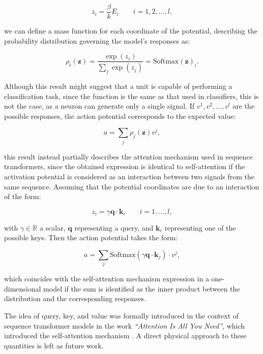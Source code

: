 \documentclass[12pt]{article}
\begin{document}
\begin{equation}
z_i = \frac{\beta}{k} E_i \qquad i = 1, 2, \dots, l  ,
\end{equation}

we can define a mass function for each coordinate of the potential, describing the probability distribution governing the model’s responses as:

\begin{equation}
\rho_i(\mathbf{z}) = \frac{\exp(z_i)}{\sum_j \exp(z_j)} = \text{Softmax}(\mathbf{z})_i.
\end{equation}

Although this result might suggest that a unit is capable of performing a classification task, since the function is the same as that used in classifiers, this is not the case, as a neuron can generate only a single signal. If $v^1, v^2, \dots, v^l$ are the possible responses, the action potential corresponds to the expected value:

\begin{equation}
a = \sum_j \rho_j(\mathbf{z}) v^j,
\end{equation}

this result instead partially describes the attention mechanism used in sequence transformers, since the obtained expression is identical to self-attention if the activation potential is considered as an interaction between two signals from the same sequence. Assuming that the potential coordinates are due to an interaction of the form:

\begin{equation}
z_i = \gamma \mathbf{q} \cdot \mathbf{k}_i \qquad i = 1, \dots, l,
\end{equation}

with $\gamma \in \mathbb{R}$ a scalar, $\mathbf{q}$ representing a query, and $\mathbf{k}_i$ representing one of the possible keys. Then the action potential takes the form:

\begin{equation}
a = \sum_j \text{Softmax}(\gamma \mathbf{q} \cdot \mathbf{k}_j) \cdot v^j,
\end{equation}

which coincides with the self-attention mechanism expression in a one-dimensional model if the sum is identified as the inner product between the distribution and the corresponding responses.

The idea of query, key, and value was formally introduced in the context of sequence transformer models in the work \emph{“Attention Is All You Need”}, which introduced the self-attention mechanism \cite{vaswani2017attention}. A direct physical approach to these quantities is left as future work.
\end{document}
